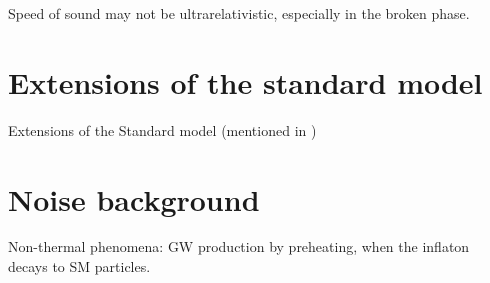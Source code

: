 Speed of sound may not be ultrarelativistic, especially in the broken phase.


\section{Extensions of the standard model}
Extensions of the Standard model \cite{caprini_detecting_2020}
(mentioned in \cite[p. 14]{lecture_notes})

\section{Noise background}
Non-thermal phenomena: GW production by preheating, when the inflaton decays to SM particles.
\cite{lecture_notes}
